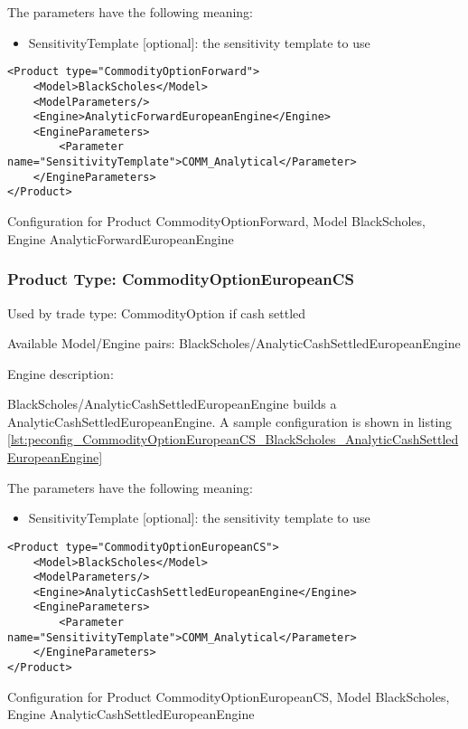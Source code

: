 The parameters have the following meaning:

\begin{itemize}
\item SensitivityTemplate [optional]: the sensitivity template to use 
\end{itemize}

\begin{longlisting}
\begin{verbatim}
<Product type="CommodityOptionForward">
    <Model>BlackScholes</Model>
    <ModelParameters/>
    <Engine>AnalyticForwardEuropeanEngine</Engine>
    <EngineParameters>
        <Parameter name="SensitivityTemplate">COMM_Analytical</Parameter>
    </EngineParameters>
</Product>
\end{verbatim}
\caption{Configuration for Product CommodityOptionForward, Model BlackScholes, Engine AnalyticForwardEuropeanEngine}
\label{lst:peconfig_CommodityOptionForward_BlackScholes_AnalyticForwardEuropeanEngine}
\end{longlisting}

\subsubsection{Product Type: CommodityOptionEuropeanCS}

Used by trade type: CommodityOption if cash settled

Available Model/Engine pairs: BlackScholes/AnalyticCashSettledEuropeanEngine

Engine description:

BlackScholes/AnalyticCashSettledEuropeanEngine builds a AnalyticCashSettledEuropeanEngine. A sample configuration is shown in listing
\ref{lst:peconfig_CommodityOptionEuropeanCS_BlackScholes_AnalyticCashSettledEuropeanEngine}

The parameters have the following meaning:

\begin{itemize}
\item SensitivityTemplate [optional]: the sensitivity template to use 
\end{itemize}

\begin{longlisting}
\begin{verbatim}
<Product type="CommodityOptionEuropeanCS">
    <Model>BlackScholes</Model>
    <ModelParameters/>
    <Engine>AnalyticCashSettledEuropeanEngine</Engine>
    <EngineParameters>
        <Parameter name="SensitivityTemplate">COMM_Analytical</Parameter>
    </EngineParameters>
</Product>
\end{verbatim}
\caption{Configuration for Product CommodityOptionEuropeanCS, Model BlackScholes, Engine AnalyticCashSettledEuropeanEngine}
\label{lst:peconfig_CommodityOptionEuropeanCS_BlackScholes_AnalyticCashSettledEuropeanEngine}
\end{longlisting}

